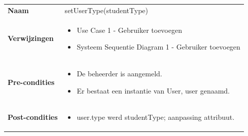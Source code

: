 \documentclass[a4paper]{article}
\begin{document}
\begin{tabularx}{\textwidth}{|l X|}
    \hline
    \textbf{Naam} & setUserType(studentType) \\
    \textbf{Verwijzingen} & \begin{itemize}[leftmargin=*]
        \item Use Case 1 - Gebruiker toevoegen
        \item Systeem Sequentie Diagram 1 - Gebruiker toevoegen
    \end{itemize}\\
    \textbf{Pre-condities} & \begin{itemize}[leftmargin=*]
        \item De beheerder is aangemeld.
        \item Er bestaat een instantie van User, user genaamd.
    \end{itemize}\\
    \textbf{Post-condities} & \begin{itemize}[leftmargin=*]
        \item user.type werd studentType; aanpassing attribuut.
    \end{itemize}\\
    \hline
\end{tabularx}\\
\end{document}
